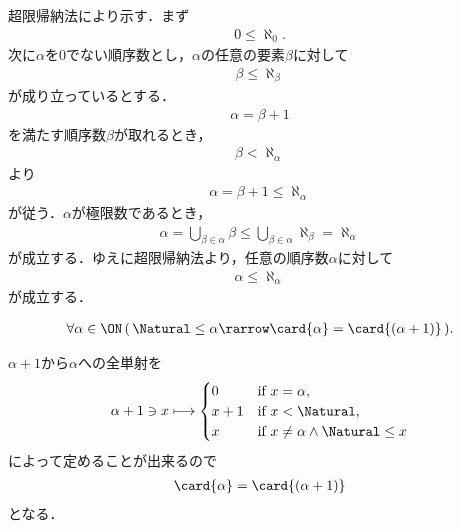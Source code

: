 	\begin{sketch}
		超限帰納法により示す．まず
		\begin{align}
			0 \leq \aleph_{0}.
		\end{align}
		次に$\alpha$を$0$でない順序数とし，$\alpha$の任意の要素$\beta$に対して
		\begin{align}
			\beta \leq \aleph_{\beta}
		\end{align}
		が成り立っているとする．
		\begin{align}
			\alpha = \beta + 1
		\end{align}
		を満たす順序数$\beta$が取れるとき，
		\begin{align}
			\beta < \aleph_{\alpha}
		\end{align}
		より
		\begin{align}
			\alpha = \beta + 1 \leq \aleph_{\alpha}
		\end{align}
		が従う．$\alpha$が極限数であるとき，
		\begin{align}
			\alpha = \bigcup_{\beta \in \alpha} \beta
			\leq \bigcup_{\beta \in \alpha} \aleph_{\beta}
			= \aleph_{\alpha}
		\end{align}
		が成立する．ゆえに超限帰納法より，任意の順序数$\alpha$に対して
		\begin{align}
			\alpha \leq \aleph_{\alpha}
		\end{align}
		が成立する．
		\QED
	\end{sketch}
	
	\begin{screen}
		\begin{thm}[無限順序数は後続数と濃度が等しい]
			\begin{align}
				\forall \alpha \in \ON\, (\,
				\Natural \leq \alpha \rarrow \card{\alpha} = \card{(\alpha + 1)}\, ).
			\end{align}
		\end{thm}
	\end{screen}
	
	\begin{sketch}
		$\alpha + 1$から$\alpha$への全単射を
		\begin{align}
			\alpha + 1 \ni x \longmapsto
			\begin{cases}
				0 & \mbox{if } x = \alpha, \\
				x + 1 & \mbox{if } x < \Natural, \\
				x & \mbox{if } x \neq \alpha \wedge \Natural \leq x
			\end{cases}
		\end{align}
		によって定めることが出来るので
		\begin{align}
			\card{\alpha} = \card{(\alpha + 1)}
		\end{align}
		となる．
		\QED
	\end{sketch}
	
